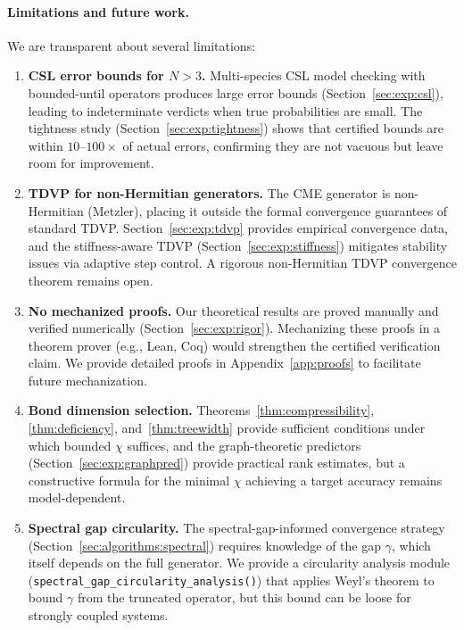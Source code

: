 \documentclass[11pt]{article}
\begin{document}
\paragraph{Limitations and future work.}
We are transparent about several limitations:

\begin{enumerate}[leftmargin=*,itemsep=2pt]
\item \textbf{CSL error bounds for $N > 3$.}
  Multi-species CSL model checking with bounded-until operators
  produces large error bounds (Section~\ref{sec:exp:csl}),
  leading to indeterminate verdicts when true probabilities are
  small.
  The tightness study (Section~\ref{sec:exp:tightness}) shows
  that certified bounds are within $10$--$100\times$ of actual errors,
  confirming they are not vacuous but leave room for improvement.

\item \textbf{TDVP for non-Hermitian generators.}
  The CME generator is non-Hermitian (Metzler), placing it outside
  the formal convergence guarantees of standard TDVP.
  Section~\ref{sec:exp:tdvp} provides empirical convergence data,
  and the stiffness-aware TDVP (Section~\ref{sec:exp:stiffness})
  mitigates stability issues via adaptive step control.
  A rigorous non-Hermitian TDVP convergence theorem remains open.

\item \textbf{No mechanized proofs.}
  Our theoretical results are proved
  manually and verified numerically (Section~\ref{sec:exp:rigor}).
  Mechanizing these proofs in a theorem prover (e.g., Lean, Coq)
  would strengthen the certified verification claim.
  We provide detailed proofs in Appendix~\ref{app:proofs} to
  facilitate future mechanization.

\item \textbf{Bond dimension selection.}
  Theorems~\ref{thm:compressibility}, \ref{thm:deficiency},
  and~\ref{thm:treewidth} provide
  sufficient conditions under which bounded $\chi$ suffices,
  and the graph-theoretic predictors (Section~\ref{sec:exp:graphpred})
  provide practical rank estimates, but a constructive formula for the
  minimal $\chi$ achieving a target accuracy remains model-dependent.

\item \textbf{Spectral gap circularity.}
  The spectral-gap-informed convergence strategy
  (Section~\ref{sec:algorithms:spectral}) requires knowledge of
  the gap $\gamma$, which itself depends on the full generator.
  We provide a circularity analysis module
  ({\tt spectral\_gap\_circularity\_analysis()}) that applies Weyl's
  theorem to bound $\gamma$ from the truncated operator, but this
  bound can be loose for strongly coupled systems.
\end{enumerate}
\end{document}
